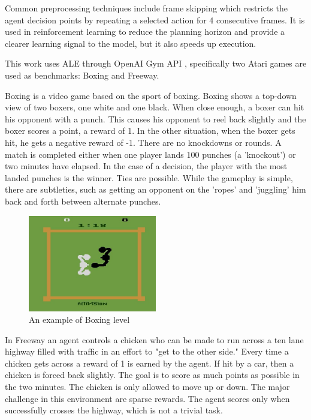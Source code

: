 Common preprocessing techniques include frame skipping \cite{Study.FrameSkipping} which restricts the agent decision points by repeating a selected action for 4 consecutive frames. It is used in reinforcement learning \cite{Algo.DQN} to reduce the planning horizon and provide a clearer learning signal to the model, but it also speeds up execution.

This work uses ALE through OpenAI Gym API \cite{Code.OpenAIGym}, specifically two Atari games are used as benchmarks: Boxing and Freeway.

Boxing is a video game based on the sport of boxing. Boxing shows a top-down view of two boxers, one white and one black. When close enough, a boxer can hit his opponent with a punch. This causes his opponent to reel back slightly and the boxer scores a point, a reward of 1. In the other situation, when the boxer gets hit, he gets a negative reward of -1. There are no knockdowns or rounds. A match is completed either when one player lands 100 punches (a 'knockout') or two minutes have elapsed. In the case of a decision, the player with the most landed punches is the winner. Ties are possible. 
While the gameplay is simple, there are subtleties, such as getting an opponent on the 'ropes' and 'juggling' him back and forth between alternate punches. 

\begin{figure}[H]
\includegraphics[width=0.5\textwidth,keepaspectratio]{figures/Boxing.jpg}
\caption[Boxing]{An example of Boxing level}
\label{Fig.Boxing}
\end{figure}

In Freeway an agent controls a chicken who can be made to run across a ten lane highway filled with traffic in an effort to "get to the other side." Every time a chicken gets across a reward of 1 is earned by the agent. If hit by a car, then a chicken is forced back slightly. The goal is to score as much points as possible in the two minutes. The chicken is only allowed to move up or down. 
The major challenge in this environment are sparse rewards. The agent scores only when successfully crosses the highway, which is not a trivial task.

